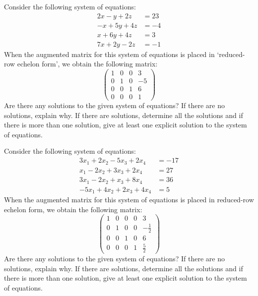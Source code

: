 \documentclass[12pt,letterpaper]{exam}
\begin{document}
\begin{questions}



\newpage
\question[10] Consider the following system of equations:
	\[
	\begin{aligned}
	2x - y + 2z&= 23 \\
	-x + 5y + 4z&= -4 \\
	x + 6y + 4z&= 3 \\
	7x + 2y - 2z&= -1
	\end{aligned}
	\]
When the augmented matrix for this system of equations is placed in `reduced-row echelon form', we obtain the following matrix:
	\[
	\begin{pmatrix}
	1 & 0 & 0 & 3 \\
	0 & 1 & 0 & -5 \\
	0 & 0 & 1 & 6 \\
	0 & 0 & 0 & 1
	\end{pmatrix}	
	\]
Are there any solutions to the given system of equations? If there are no solutions, explain why. If there are solutions, determine all the solutions and if there is more than one solution, give at least one explicit solution to the system of equations.  



\newpage
\question[10] Consider the following system of equations:
	\[
	\begin{aligned}
	3x_1 + 2x_2 - 5x_3 + 2x_4&= -17 \\
	x_1 - 2x_2 + 3x_3 + 2x_4&= 27 \\
	3x_1 - 2x_2 + x_3 + 8x_4&= 36 \\
	-5x_1 + 4x_2 + 2x_3 + 4x_4&= 5
	\end{aligned}
	\]
When the augmented matrix for this system of equations is placed in reduced-row echelon form, we obtain the following matrix:
	\[
	\begin{pmatrix}
	1 & 0 & 0 & 0 & 3 \\
	0 & 1 & 0 & 0 & -\frac{1}{2} \\
	0 & 0 & 1 & 0 & 6 \\
	0 & 0 & 0 & 1 & \frac{5}{2}
	\end{pmatrix}	
	\]
Are there any solutions to the given system of equations? If there are no solutions, explain why. If there are solutions, determine all the solutions and if there is more than one solution, give at least one explicit solution to the system of equations.  




\end{questions}
\end{document}
